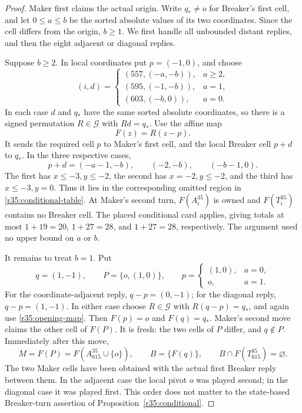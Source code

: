 \begin{proof}
Maker first claims the actual origin.  Write \(q_*\ne o\) for Breaker's
first cell, and let \(0\le a\le b\) be the sorted absolute values of its
two coordinates.  Since the cell differs from the origin, \(b\ge1\).
We first handle all unbounded distant replies, and then the eight
adjacent or diagonal replies.

Suppose \(b\ge2\).  In local coordinates put \(p=(-1,0)\), and choose
\begin{equation}\label{r35:distant-choice}
 (i,d)=
 \begin{cases}
 (557,(-a,-b)),&a\ge2,\\
 (595,(-1,-b)),&a=1,\\
 (603,(-b,0)),&a=0.
 \end{cases}
\end{equation}
In each case \(d\) and \(q_*\) have the same sorted absolute
coordinates, so there is a signed permutation \(R\in\mathcal G\) with
\(Rd=q_*\).  Use the affine map
\begin{equation}\label{r35:opening-map}
 F(z)=R(z-p).
\end{equation}
It sends the required cell \(p\) to Maker's first cell, and the local
Breaker cell \(p+d\) to \(q_*\).  In the three respective cases,
\[
 p+d=(-a-1,-b),\qquad (-2,-b),\qquad (-b-1,0).
\]
The first has \(x\le-3,y\le-2\), the second has \(x=-2,y\le-2\), and
the third has \(x\le-3,y=0\).  Thus it lies in the corresponding
omitted region in \eqref{r35:conditional-table}.  At Maker's second
turn, \(F(A_i^{35})\) is owned and \(F(T_i^{35})\) contains no Breaker
cell.  The placed conditional card applies, giving totals at most
\(1+19=20\), \(1+27=28\), and \(1+27=28\), respectively.  The
argument used no upper bound on \(a\) or \(b\).

It remains to treat \(b=1\).  Put
\[
 q=(1,-1),\qquad P=\{o,(1,0)\},\qquad
 p=\begin{cases}(1,0),&a=0,\\o,&a=1.\end{cases}
\]
For the coordinate-adjacent reply, \(q-p=(0,-1)\); for the diagonal
reply, \(q-p=(1,-1)\).  In either case choose \(R\in\mathcal G\) with
\(R(q-p)=q_*\), and again use \eqref{r35:opening-map}.  Then
\(F(p)=o\) and \(F(q)=q_*\).  Maker's second move claims the other
cell of \(F(P)\).  It is fresh: the two cells of \(P\) differ, and
\(q\notin P\).  Immediately after this move,
\[
 M=F(P)=F(A_{615}^{35}\cup\{o\}),\qquad
 B=\{F(q)\},\qquad B\cap F(T_{615}^{35})=\varnothing.
\]
The two Maker cells have been obtained with the actual first Breaker
reply between them.  In the adjacent case the local pivot \(o\) was
played second; in the diagonal case it was played first.  This order
does not matter to the state-based Breaker-turn assertion of
Proposition~\ref{r35:conditional}.


\end{proof}
